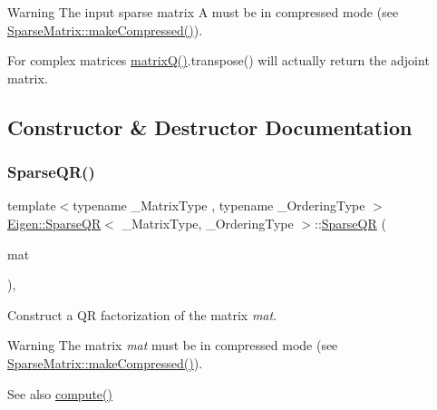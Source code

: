 \begin{DoxyWarning}{Warning}
The input sparse matrix A must be in compressed mode (see \mbox{\hyperlink{class_eigen_1_1_sparse_matrix_a5ff54ffc10296f9466dc81fa888733fd}{Sparse\+Matrix\+::make\+Compressed()}}). 

For complex matrices \mbox{\hyperlink{class_eigen_1_1_sparse_q_r_ae1cc0a836c177d4f42600f8639354be1}{matrix\+Q()}}.transpose() will actually return the adjoint matrix. 
\end{DoxyWarning}


\subsection{Constructor \& Destructor Documentation}
\mbox{\label{class_eigen_1_1_sparse_q_r_ac50f705d686d4bc687ce6acbc76447d2}} 
\subsubsection{\texorpdfstring{SparseQR()}{SparseQR()}}
{\footnotesize\ttfamily template$<$typename \+\_\+\+Matrix\+Type , typename \+\_\+\+Ordering\+Type $>$ \\
\mbox{\hyperlink{class_eigen_1_1_sparse_q_r}{Eigen\+::\+Sparse\+QR}}$<$ \+\_\+\+Matrix\+Type, \+\_\+\+Ordering\+Type $>$\+::\mbox{\hyperlink{class_eigen_1_1_sparse_q_r}{Sparse\+QR}} (\begin{DoxyParamCaption}\item[{const Matrix\+Type \&}]{mat }\end{DoxyParamCaption})\hspace{0.3cm}{\ttfamily [inline]}, {\ttfamily [explicit]}}

Construct a QR factorization of the matrix {\itshape mat}.

\begin{DoxyWarning}{Warning}
The matrix {\itshape mat} must be in compressed mode (see \mbox{\hyperlink{class_eigen_1_1_sparse_matrix_a5ff54ffc10296f9466dc81fa888733fd}{Sparse\+Matrix\+::make\+Compressed()}}).
\end{DoxyWarning}
\begin{DoxySeeAlso}{See also}
\mbox{\hyperlink{class_eigen_1_1_sparse_q_r_aedaf52b7543de4d55c58c8f830c2aeb7}{compute()}} 
\end{DoxySeeAlso}


